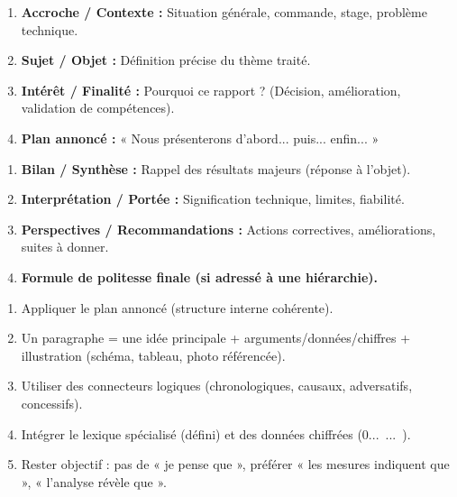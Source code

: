 \documentclass[11pt]{article}
\newcommand{\cle}[1]{{\popxbold\color{popdark}#1}}
\newcounter{popsec}
\newcounter{popsub}
\newcommand{\courssub}[1]{%
  \stepcounter{popsub}%
  \par\vspace{9pt}\noindent{\popxbold\fontsize{11.5}{13}\selectfont\color{popink}{\color{poporange}\thepopsec.\thepopsub}\hspace{6pt}#1}\par\nopagebreak\vspace{4pt}
}
\begin{document}
\begin{bilan}
\courssub{Méthodes express}

\begin{methode}
\begin{enumerate}
\item \textbf{Accroche / Contexte :} Situation générale, commande, stage, problème technique.
\item \textbf{Sujet / Objet :} Définition précise du thème traité.
\item \textbf{Intérêt / Finalité :} Pourquoi ce rapport ? (Décision, amélioration, validation de compétences).
\item \textbf{Plan annoncé :} « Nous présenterons d'abord... puis... enfin... »
\end{enumerate}
\end{methode}

\begin{methode}
\begin{enumerate}
\item \textbf{Bilan / Synthèse :} Rappel des résultats majeurs (réponse à l'objet).
\item \textbf{Interprétation / Portée :} Signification technique, limites, fiabilité.
\item \textbf{Perspectives / Recommandations :} Actions correctives, améliorations, suites à donner.
\item \textbf{Formule de politesse finale (si adressé à une hiérarchie).}
\end{enumerate}
\end{methode}

\begin{methode}
\begin{enumerate}
\item Appliquer le plan annoncé (structure interne cohérente).
\item Un paragraphe = une idée principale + arguments/données/chiffres + illustration (schéma, tableau, photo référencée).
\item Utiliser des \cle{connecteurs logiques} (chronologiques, causaux, adversatifs, concessifs).
\item Intégrer le lexique spécialisé (défini) et des données chiffrées (\SI{...}{...}).
\item Rester \cle{objectif} : pas de « je pense que », préférer « les mesures indiquent que », « l'analyse révèle que ».
\end{enumerate}
\end{methode}


\end{bilan}
\end{document}
